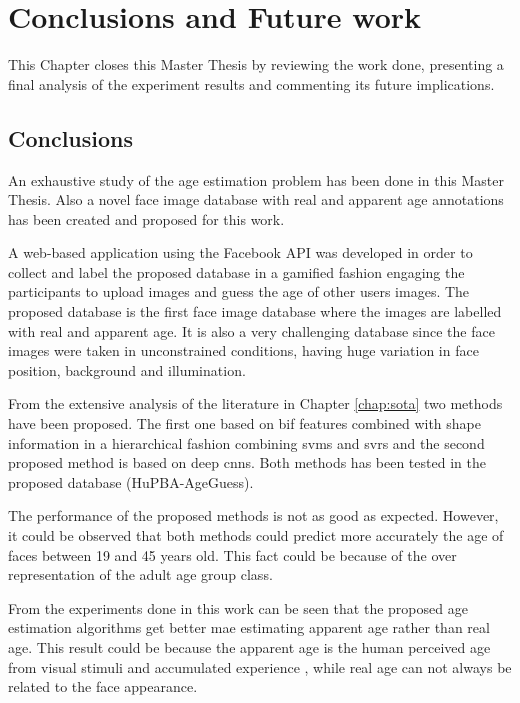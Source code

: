 \chapter{Conclusions and Future work} \label{chap:conclusions}

This Chapter closes this Master Thesis by reviewing the work done, presenting a final analysis of the experiment results and commenting its future implications.

\section{Conclusions}

An exhaustive study of the age estimation problem has been done in this Master Thesis. Also a novel face image database with real and apparent age annotations has been created and proposed for this work.

A web-based application using the Facebook API was developed in order to collect and label the proposed database in a gamified fashion engaging the participants to upload images and guess the age of other users images. The proposed database is the first face image database where the images are labelled with real and apparent age. It is also a very challenging database since the face images were taken in unconstrained conditions, having huge variation in face position, background and illumination.

From the extensive analysis of the literature in Chapter \ref{chap:sota} two methods have been proposed. The first one based on \gls{bif} features combined with shape information in a hierarchical fashion combining \glspl{svm} and \glspl{svr} and the second proposed method is based on deep \glspl{cnn}. Both methods has been tested in the proposed database (HuPBA-AgeGuess).

The performance of the proposed methods is not as good as expected. However, it could be observed that both methods could predict more accurately the age of faces between 19 and 45 years old. This fact could be because of the over representation of the adult age group class.

From the experiments done in this work can be seen that the proposed age estimation algorithms get better \gls{mae} estimating apparent age rather than real age. This result could be because the apparent age is the human perceived age from visual stimuli and accumulated experience , while real age can not always be related to the face appearance.

